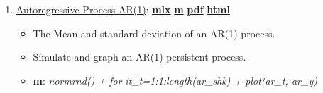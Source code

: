 \documentclass[
]{book}
\providecommand{\tightlist}{%
  \setlength{\itemsep}{0pt}\setlength{\parskip}{0pt}}
\begin{document}
\begin{enumerate}
\def\labelenumi{\arabic{enumi}.}
\tightlist
\item
  \href{https://fanwangecon.github.io/M4Econ/panel/timeseries/htmlpdfm/fs_autoregressive.html}{Autoregressive Process AR(1)}: \href{https://github.com/FanWangEcon/M4Econ/blob/master/panel/timeseries/fs_autoregressive.mlx}{\textbf{mlx}} \textbar{} \href{https://github.com/FanWangEcon/M4Econ/blob/master/panel/timeseries/htmlpdfm/fs_autoregressive.m}{\textbf{m}} \textbar{} \href{https://github.com/FanWangEcon/M4Econ/blob/master/panel/timeseries/htmlpdfm/fs_autoregressive.pdf}{\textbf{pdf}} \textbar{} \href{https://fanwangecon.github.io/M4Econ/panel/timeseries/htmlpdfm/fs_autoregressive.html}{\textbf{html}}

  \begin{itemize}
  \tightlist
  \item
    The Mean and standard deviation of an AR(1) process.
  \item
    Simulate and graph an AR(1) persistent process.
  \item
    \textbf{m}: \emph{normrnd() + for it\_t=1:1:length(ar\_shk) + plot(ar\_t, ar\_y)}
  \end{itemize}
\end{enumerate}

  
\end{document}
